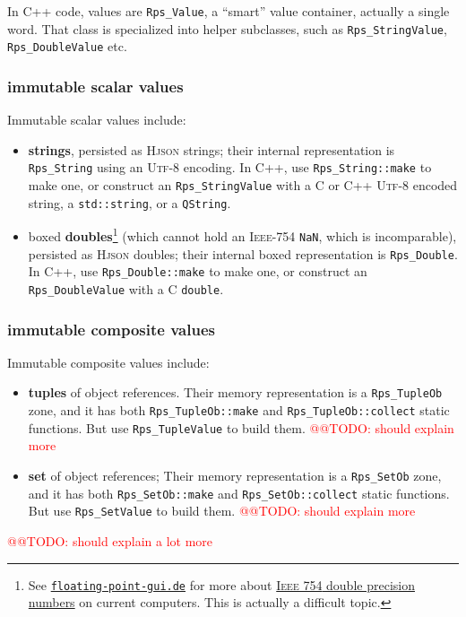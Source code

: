 \documentclass[11pt,a4paper,svgnames]{article}
\begin{document}
In C++ code, values are \texttt{Rps\_Value}, a ``smart'' value
container, actually a single word. That class is specialized into
helper subclasses, such as \texttt{Rps\_StringValue},
\texttt{Rps\_DoubleValue} etc.

\subsubsection{immutable scalar values}
\label{subsubsec:immutable-scalar}

Immutable scalar values include:
\begin{itemize}
  \item \textbf{strings},  persisted as \textsc{Hjson} strings; their internal
    representation is \texttt{Rps\_String} using an \textsc{Utf-8}
    encoding. In C++, use \texttt{Rps\_String::make} to make one, or
    construct an \texttt{Rps\_StringValue} with a C or C++ \textsc{Utf-8} encoded
    string, a \texttt{std::string}, or a \texttt{QString}.
    \item boxed \textbf{doubles}\footnote{See
    \href{http://floating-point-gui.de}{\texttt{floating-point-gui.de}}
      for more about
      \href{https://en.wikipedia.org/wiki/IEEE\_754}{\textsc{Ieee 754}
        double precision numbers} on current computers. This is
      actually a difficult topic.} (which cannot hold an
    \textsc{Ieee-754} \texttt{NaN}, which is incomparable), persisted
    as \textsc{Hjson} doubles; their internal boxed representation is
    \texttt{Rps\_Double}. In C++, use \texttt{Rps\_Double::make} to make one, or
    construct an \texttt{Rps\_DoubleValue} with a C \texttt{double}.
\end{itemize}

\subsubsection{immutable composite values}
\label{subsubsec:immutable-composite}

Immutable composite values include:
\begin{itemize}
\item \textbf{tuples} of object references. Their memory
  representation is a \texttt{Rps\_TupleOb} zone, and it has both
  \texttt{Rps\_TupleOb::make} and \texttt{Rps\_TupleOb::collect} static functions. But use
  \texttt{Rps\_TupleValue} to build them. \textcolor{red}{@@TODO:
    should explain more}
\item \textbf{set} of object references; Their memory
  representation is a \texttt{Rps\_SetOb} zone, and it has both
  \texttt{Rps\_SetOb::make} and \texttt{Rps\_SetOb::collect} static functions. But use
  \texttt{Rps\_SetValue} to build them.  \textcolor{red}{@@TODO: should explain more}
\end{itemize}
\textcolor{red}{@@TODO: should explain a lot more}
\end{document}
